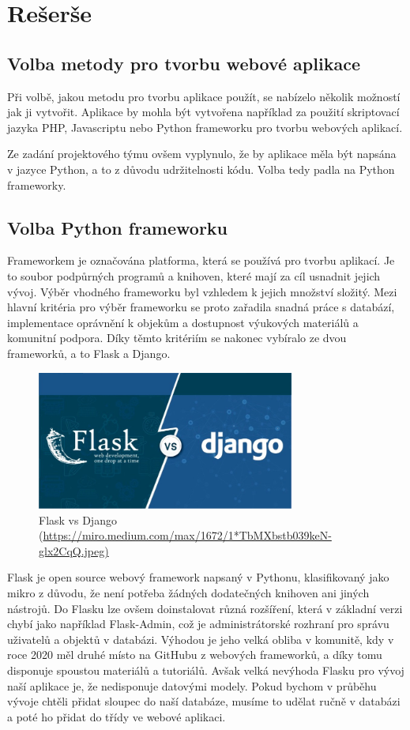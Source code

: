 \chapter{Rešerše}
\label{1-reserse}

\section{Volba metody pro tvorbu webové aplikace}

Při volbě, jakou metodu pro tvorbu aplikace použít, se nabízelo několik
možností jak ji vytvořit. Aplikace by mohla být vytvořena například za použití
skriptovací jazyka PHP, Javascriptu nebo Python frameworku 
pro tvorbu webových aplikací. 

Ze zadání projektového týmu ovšem vyplynulo, že by aplikace měla být
napsána v jazyce Python, a to z důvodu udržitelnosti kódu. Volba tedy
padla na Python frameworky.

\section{Volba Python frameworku}
Frameworkem je označována platforma, která se používá pro tvorbu aplikací. 
Je to soubor podpůrných programů a knihoven, které mají za cíl usnadnit 
jejich vývoj. Výběr vhodného frameworku byl vzhledem k jejich množství 
složitý. Mezi hlavní kritéria pro výběr frameworku se proto zařadila snadná
práce s databází, implementace oprávnění k objekům a dostupnost 
výukových materiálů a komunitní podpora. Díky těmto kritériím se nakonec 
vybíralo ze dvou frameworků, a to Flask a Django.

\begin{figure}[H] \centering
    \includegraphics[width=240pt]{./pictures/1-django-vs-flask.jpeg}
    \caption[Flask vs Django]{Flask vs Django (\url{https://miro.medium.com/max/1672/1*TbMXbstb039keN-glx2CqQ.jpeg)}}
	\label{fig:Flask vs Django}                                
\end{figure}

Flask je open source webový framework napsaný v Pythonu, klasifikovaný
jako mikro z důvodu, že není potřeba žádných dodatečných knihoven ani
jiných nástrojů. Do Flasku lze ovšem doinstalovat různá rozšíření,
která v základní verzi chybí jako například Flask-Admin, což je
administrátorské rozhraní pro správu uživatelů a objektů v
databázi. Výhodou je jeho velká obliba v komunitě, kdy v roce 2020 měl
druhé místo na GitHubu z webových frameworků, a díky tomu disponuje
spoustou materiálů a tutoriálů. Avšak velká nevýhoda Flasku pro vývoj
naší aplikace je, že nedisponuje datovými modely. Pokud bychom v průběhu
vývoje chtěli přidat sloupec do naší databáze, musíme to udělat ručně
v databázi a poté ho přidat do třídy ve webové aplikaci. \cite{flask}

